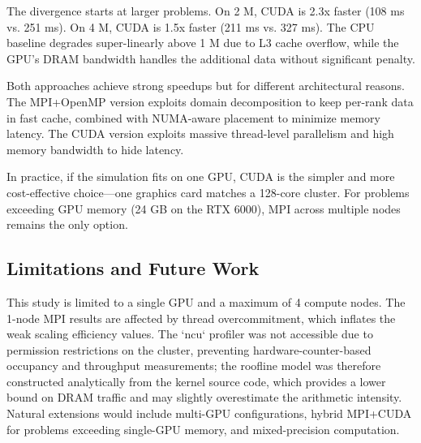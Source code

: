 \documentclass[10pt,dvipsnames,table,twocolumn]{article}
\begin{document}
The divergence starts at larger problems. On 2 M, CUDA is 2.3x faster (108 ms vs. 251 ms). On 4 M, CUDA is 1.5x faster (211 ms vs. 327 ms). The CPU baseline degrades super-linearly above 1 M due to L3 cache overflow, while the GPU's DRAM bandwidth handles the additional data without significant penalty.

Both approaches achieve strong speedups but for different architectural reasons. The MPI+OpenMP version exploits domain decomposition to keep per-rank data in fast cache, combined with NUMA-aware placement to minimize memory latency. The CUDA version exploits massive thread-level parallelism and high memory bandwidth to hide latency.

In practice, if the simulation fits on one GPU, CUDA is the simpler and more cost-effective choice—one graphics card matches a 128-core cluster. For problems exceeding GPU memory (24 GB on the RTX 6000), MPI across multiple nodes remains the only option.


\subsection{Limitations and Future Work}

This study is limited to a single GPU and a maximum of 4 compute nodes. The 1-node MPI results are affected by thread overcommitment, which inflates the weak scaling efficiency values. The `ncu` profiler was not accessible due to permission restrictions on the cluster, preventing hardware-counter-based occupancy and throughput measurements; the roofline model was therefore constructed analytically from the kernel source code, which provides a lower bound on DRAM traffic and may slightly overestimate the arithmetic intensity. Natural extensions would include multi-GPU configurations, hybrid MPI+CUDA for problems exceeding single-GPU memory, and mixed-precision computation.
\end{document}
